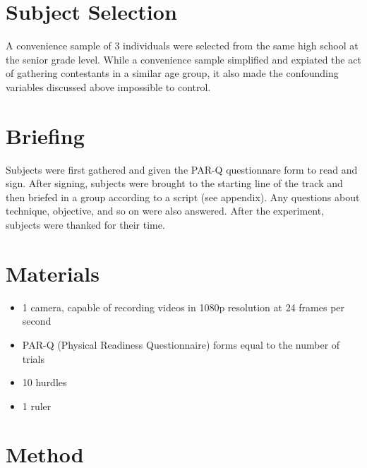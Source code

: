 \documentclass[index]{subfiles}
\begin{document}
\section{Subject Selection}
A convenience sample of 3 individuals were selected from the same high school at the senior grade level. While a convenience sample simplified and expiated the act of gathering contestants in a similar age group, it also made the confounding variables discussed above impossible to control.

\section{Briefing}
Subjects were first gathered and given the PAR-Q questionnare form to read and sign. After signing, subjects were brought to the starting line of the track and then briefed in a group according to a script (see appendix). Any questions about technique, objective, and so on were also answered. After the experiment, subjects were thanked for their time.

\section{Materials}

\begin{itemize}
    \item 1 camera, capable of recording videos in 1080p resolution at 24 frames per second
    \item PAR-Q (Physical Readiness Questionnaire) forms equal to the number of trials
    \item 10 hurdles
    \item 1 ruler

\end{itemize}

\section{Method}
\end{document}
